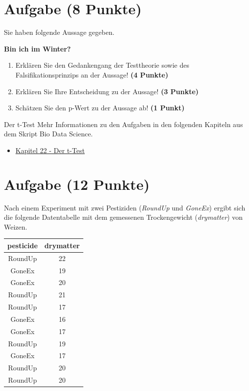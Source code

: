 \documentclass[a4paper, 10pt]{scrartcl}\usepackage[]{graphicx}\usepackage[]{xcolor}
\begin{document}
\clearpage

\section{Aufgabe \hfill (8 Punkte)}



Sie haben folgende Aussage gegeben.

\begin{center}
  \Large\textbf{Bin ich im Winter?}
\end{center}

\begin{enumerate}
\item Erkl{\"a}ren Sie den Gedankengang der Testtheorie sowie des Falsifikationsprinzips an der Aussage! \textbf{(4 Punkte)}
\item Erkl{\"a}ren Sie Ihre Entscheidung zu der Aussage! \textbf{(3 Punkte)}
\item Sch{\"a}tzen Sie den p-Wert zu der Aussage ab! \textbf{(1 Punkt)}
\end{enumerate}

 
\clearpage
\begin{graybox}{Der t-Test}
Mehr Informationen zu den Aufgaben in den folgenden Kapiteln aus dem Skript Bio Data Science.
  \begin{itemize}
  \item \href{https://jkruppa.github.io/stat-tests-ttest.html}{Kapitel 22 - Der t-Test}
  \end{itemize}
\end{graybox}

\section{Aufgabe \hfill (12 Punkte)}

Nach einem Experiment mit zwei Pestiziden (\textit{RoundUp} und
\textit{GoneEx}) ergibt sich die folgende Datentabelle mit dem gemessenen
Trockengewicht (\textit{drymatter}) von Weizen.

\begin{table}[!h]
\centering
\begin{tabular}{cc}
\toprule
pesticide & drymatter\\
\midrule
RoundUp & 22\\
GoneEx & 19\\
GoneEx & 20\\
RoundUp & 21\\
RoundUp & 17\\
\addlinespace
GoneEx & 16\\
GoneEx & 17\\
RoundUp & 19\\
GoneEx & 17\\
RoundUp & 20\\
\addlinespace
RoundUp & 20\\
\bottomrule
\end{tabular}
\end{table}
\end{document}
